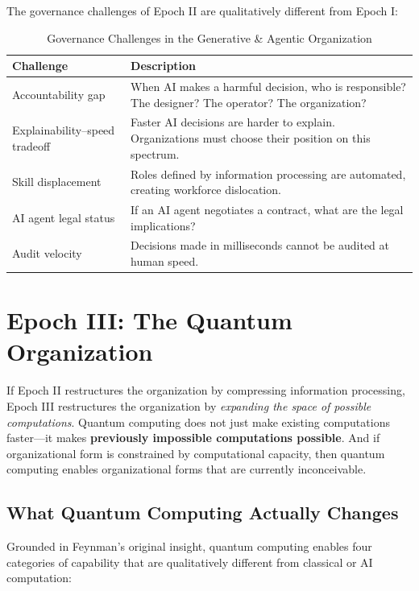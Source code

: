 \documentclass[11pt,a4paper,twocolumn]{article}
\begin{document}
The governance challenges of Epoch II are qualitatively different from Epoch I:

\begin{table}[H]
\centering
\small
\begin{tabular}{@{} >{\raggedright\arraybackslash}p{2.6cm} >{\raggedright\arraybackslash}p{4.8cm} @{}}
\toprule
\textbf{Challenge} & \textbf{Description} \\
\midrule
Accountability gap & When AI makes a harmful decision, who is responsible? The designer? The operator? The organization? \\[6pt]
Explainability--speed tradeoff & Faster AI decisions are harder to explain. Organizations must choose their position on this spectrum. \\[6pt]
Skill displacement & Roles defined by information processing are automated, creating workforce dislocation. \\[6pt]
AI agent legal status & If an AI agent negotiates a contract, what are the legal implications? \\[6pt]
Audit velocity & Decisions made in milliseconds cannot be audited at human speed. \\
\bottomrule
\end{tabular}
\caption{Governance Challenges in the Generative \& Agentic Organization}
\label{tab:ai-governance}
\end{table}


\section{Epoch III: The Quantum Organization}
\label{sec:epoch-quantum}

If Epoch II restructures the organization by compressing information processing, Epoch III restructures the organization by \textit{expanding the space of possible computations}. Quantum computing does not just make existing computations faster---it makes \textbf{previously impossible computations possible}. And if organizational form is constrained by computational capacity, then quantum computing enables organizational forms that are currently inconceivable.

\subsection{What Quantum Computing Actually Changes}

Grounded in Feynman's original insight, quantum computing enables four categories of capability that are qualitatively different from classical or AI computation:
\end{document}
